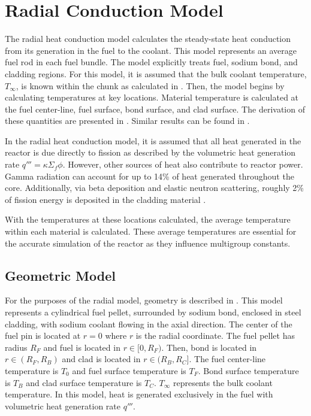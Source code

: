 \section{Radial Conduction Model}
  \label{sec:radial_conduction_model}

  The radial heat conduction model calculates the steady-state heat
  conduction from its generation in the fuel to the coolant. This model
  represents an average fuel rod in each fuel bundle. The model explicitly
  treats fuel, sodium bond, and cladding regions. For this model, it is assumed
  that the bulk coolant temperature, $T_{\infty}$, is known within the chunk as 
  calculated in . Then, the model begins by 
  calculating temperatures at key locations. Material temperature is calculated
  at the fuel center-line, fuel surface, bond surface, and clad surface. The
  derivation of these quantities are presented in . 
  Similar results can be found in \cite{FastSpectrumReactors}.

  In the radial heat conduction model, it is assumed that all heat generated in
  the reactor is due directly to fission as described by the volumetric heat
  generation rate $q'''=\kappa \Sigma_f \phi$. However, other sources of heat
  also contribute to reactor power. Gamma radiation can account for up to 14\%
  of heat generated throughout the core. Additionally, via beta deposition and
  elastic neutron scattering, roughly 2\% of fission energy is deposited in the
  cladding material \cite{FastSpectrumReactors}.
  
  With the
  temperatures at these locations calculated, the average temperature within
  each material is calculated. These average temperatures are essential for the
  accurate simulation of the reactor as they influence multigroup constants.

  \subsection{Geometric Model}
    For the purposes of the radial model, geometry is described in
    . This model represents a cylindrical fuel pellet,
    surrounded by sodium bond, enclosed in steel cladding, with sodium coolant
    flowing in the axial direction. The center of the fuel pin is located at
    $r=0$ where $r$ is the radial coordinate. The fuel pellet has radius $R_F$
    and fuel is located in $r \in [0,R_F)$. Then, bond is located in 
    $r \in (R_F,R_B)$ and clad is located in $r \in (R_B,R_C]$. The fuel 
    center-line temperature is $T_0$ and fuel surface temperature is $T_F$. Bond
    surface temperature is $T_B$ and clad surface temperature is 
    $T_C$. $T_{\infty}$ represents the bulk coolant temperature. In this model,
    heat is generated exclusively in the fuel with volumetric heat generation 
    rate $q'''$. 

